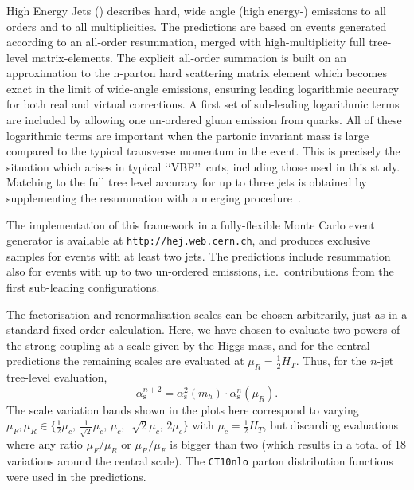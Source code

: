 \subsubsection{\hjetscompHej}
\label{sec:hjetscomp:tools:bfkl:hej}

High Energy Jets (\hjetscompHej) describes hard, wide angle (high energy-)
emissions to all orders and to all multiplicities. The predictions are based
on events generated according to an all-order resummation, merged with
high-multiplicity full tree-level matrix-elements. The explicit all-order summation
is built on an approximation to the n-parton hard scattering matrix element
\cite{Andersen:2009nu,Andersen:2009he,Andersen:2011hs} which becomes exact in
the limit of wide-angle emissions, ensuring leading logarithmic accuracy for
both real and virtual corrections. A first set of sub-leading logarithmic
terms are included by allowing one un-ordered gluon emission from quarks. All
of these logarithmic terms are important when
the partonic invariant mass is large compared to the typical transverse
momentum in the event. This is precisely the situation which arises in
typical \lq\lq VBF\rq\rq\ cuts, including those used in this study.  Matching to the
full tree level accuracy for up to three jets is obtained by supplementing
the resummation with a merging
procedure~\cite{Andersen:2008ue,Andersen:2008gc}.

The implementation of this framework in a fully-flexible Monte Carlo event
generator is available at \texttt{http://hej.web.cern.ch}, and produces
exclusive samples for events with at least two jets.  The predictions include
resummation also for events with up to two un-ordered emissions,
i.e.~contributions from the first sub-leading configurations.

The factorisation and renormalisation scales can be chosen arbitrarily, just
as in a standard fixed-order calculation. Here, we have chosen to evaluate
two powers of the strong coupling at a scale given by the Higgs mass, and for
the central predictions the remaining scales are evaluated at $\mu_R=\tfrac{1}{2}H_T$. Thus,
for the $n$-jet tree-level evaluation, 
\begin{equation}
  \alpha_\mathrm{s}^{n+2}=\alpha_\mathrm{s}^2(m_h)\cdot \alpha_\mathrm{s}^n(\mu_R).
\end{equation}
The scale variation bands shown in the plots here correspond to varying
$\mu_F,\mu_R\in \{\tfrac{1}{2}\mu_c,\,\tfrac{1}{\sqrt{2}}\mu_c,\,\mu_c,$ $\,\sqrt{2}\mu_c,\,2\mu_c\}$ with 
$\mu_c=\tfrac{1}{2}H_T$, but discarding evaluations where any ratio $\mu_F/\mu_R$ or 
$\mu_R/\mu_F$ is bigger than two (which results in a total of 18 variations
around the central scale). The \texttt{CT10nlo} \cite{Lai:2010vv,Gao:2013xoa} parton 
distribution functions were used in the predictions.
